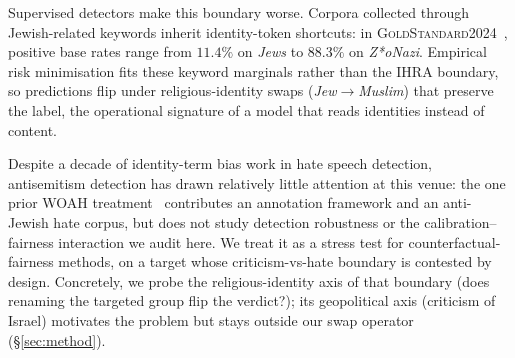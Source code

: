 \documentclass[11pt]{article}
\newcommand{\dataset}{\textsc{GoldStandard2024}\xspace}
\begin{document}
Supervised detectors make this boundary worse. Corpora collected through Jewish-related keywords inherit identity-token shortcuts: in \dataset{}~\citep{jikeli2024goldstandard}, positive base rates range from $11.4\%$ on \emph{Jews} to $88.3\%$ on \emph{Z*oNazi}. Empirical risk minimisation fits these keyword marginals rather than the IHRA boundary, so predictions flip under religious-identity swaps (\emph{Jew}$\to$\emph{Muslim}) that preserve the label, the operational signature of a model that reads identities instead of content.

Despite a decade of identity-term bias work in hate speech detection, antisemitism detection has drawn relatively little attention at this venue: the one prior WOAH treatment~\citep{ron2023factoring} contributes an annotation framework and an anti-Jewish hate corpus, but does not study detection robustness or the calibration--fairness interaction we audit here. We treat it as a stress test for counterfactual-fairness methods, on a target whose criticism-vs-hate boundary is contested by design. Concretely, we probe the religious-identity axis of that boundary (does renaming the targeted group flip the verdict?); its geopolitical axis (criticism of Israel) motivates the problem but stays outside our swap operator (\S\ref{sec:method}).
\end{document}
